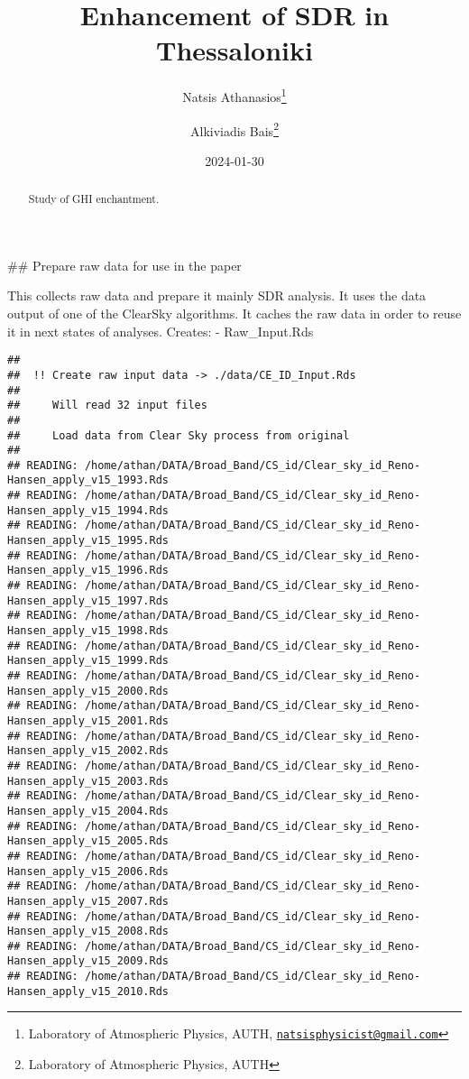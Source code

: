\documentclass[
  10pt,
  a4paper,oneside]{article}
\title{Enhancement of SDR in Thessaloniki}
\author{Natsis Athanasios\footnote{Laboratory of Atmospheric Physics, AUTH, \href{mailto:natsisphysicist@gmail.com}{\nolinkurl{natsisphysicist@gmail.com}}} \and Alkiviadis Bais\footnote{Laboratory of Atmospheric Physics, AUTH}}
\date{2024-01-30}
\begin{document}
\maketitle
\begin{abstract}
Study of GHI enchantment.
\end{abstract}

{
\hypersetup{linkcolor=}
\setcounter{tocdepth}{4}
\tableofcontents
}
\#\# Prepare raw data for use in the paper

This collects raw data and prepare it mainly SDR analysis.
It uses the data output of one of the ClearSky algorithms.
It caches the raw data in order to reuse it in next states of analyses.
Creates:
- Raw\_Input.Rds

\begin{verbatim}
## 
##  !! Create raw input data -> ./data/CE_ID_Input.Rds 
## 
##     Will read 32 input files
## 
##     Load data from Clear Sky process from original
## 
## READING: /home/athan/DATA/Broad_Band/CS_id/Clear_sky_id_Reno-Hansen_apply_v15_1993.Rds 
## READING: /home/athan/DATA/Broad_Band/CS_id/Clear_sky_id_Reno-Hansen_apply_v15_1994.Rds 
## READING: /home/athan/DATA/Broad_Band/CS_id/Clear_sky_id_Reno-Hansen_apply_v15_1995.Rds 
## READING: /home/athan/DATA/Broad_Band/CS_id/Clear_sky_id_Reno-Hansen_apply_v15_1996.Rds 
## READING: /home/athan/DATA/Broad_Band/CS_id/Clear_sky_id_Reno-Hansen_apply_v15_1997.Rds 
## READING: /home/athan/DATA/Broad_Band/CS_id/Clear_sky_id_Reno-Hansen_apply_v15_1998.Rds 
## READING: /home/athan/DATA/Broad_Band/CS_id/Clear_sky_id_Reno-Hansen_apply_v15_1999.Rds 
## READING: /home/athan/DATA/Broad_Band/CS_id/Clear_sky_id_Reno-Hansen_apply_v15_2000.Rds 
## READING: /home/athan/DATA/Broad_Band/CS_id/Clear_sky_id_Reno-Hansen_apply_v15_2001.Rds 
## READING: /home/athan/DATA/Broad_Band/CS_id/Clear_sky_id_Reno-Hansen_apply_v15_2002.Rds 
## READING: /home/athan/DATA/Broad_Band/CS_id/Clear_sky_id_Reno-Hansen_apply_v15_2003.Rds 
## READING: /home/athan/DATA/Broad_Band/CS_id/Clear_sky_id_Reno-Hansen_apply_v15_2004.Rds 
## READING: /home/athan/DATA/Broad_Band/CS_id/Clear_sky_id_Reno-Hansen_apply_v15_2005.Rds 
## READING: /home/athan/DATA/Broad_Band/CS_id/Clear_sky_id_Reno-Hansen_apply_v15_2006.Rds 
## READING: /home/athan/DATA/Broad_Band/CS_id/Clear_sky_id_Reno-Hansen_apply_v15_2007.Rds 
## READING: /home/athan/DATA/Broad_Band/CS_id/Clear_sky_id_Reno-Hansen_apply_v15_2008.Rds 
## READING: /home/athan/DATA/Broad_Band/CS_id/Clear_sky_id_Reno-Hansen_apply_v15_2009.Rds 
## READING: /home/athan/DATA/Broad_Band/CS_id/Clear_sky_id_Reno-Hansen_apply_v15_2010.Rds 

\end{verbatim}
\end{document}
